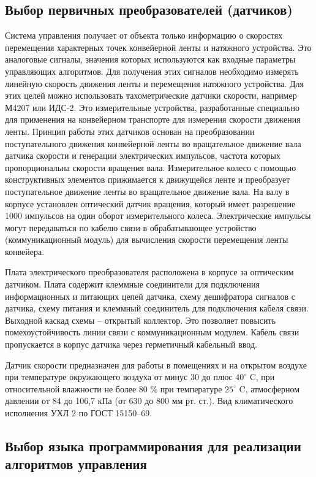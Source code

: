 \subsection{Выбор первичных преобразователей (датчиков)} \label{subsect5_2_4}

Система управления получает от объекта только информацию о скоростях перемещения характерных точек конвейерной ленты и натяжного устройства. Это аналоговые сигналы, значения которых используются как входные параметры управляющих алгоритмов. Для получения этих сигналов необходимо измерять линейную скорость движения ленты и перемещения натяжного устройства. Для этих целей можно использовать тахометрические датчики скорости, например М4207 или ИДС-2. Это измерительные устройства, разработанные специально для применения на конвейерном транспорте для измерения скорости движения ленты. Принцип работы этих датчиков основан на преобразовании поступательного движения конвейерной ленты во вращательное движение вала датчика скорости и генерации электрических импульсов, частота которых пропорциональна скорости вращения вала. Измерительное колесо с помощью конструктивных элементов прижимается к движущейся ленте и преобразует поступательное движение ленты во вращательное движение вала. На валу в корпусе установлен оптический датчик вращения, который имеет разрешение 1000 импульсов на один оборот измерительного колеса. Электрические импульсы могут передаваться по кабелю связи в обрабатывающее устройство (коммуникационный модуль) для вычисления скорости перемещения ленты конвейера.

Плата электрического преобразователя расположена в корпусе за оптическим датчиком. Плата содержит клеммные соединители для подключения информационных и питающих цепей датчика, схему дешифратора сигналов с датчика, схему питания и клеммный соединитель для подключения кабеля связи. Выходной каскад схемы -- открытый коллектор. Это позволяет повысить помехоустойчивость линии связи с коммуникационным модулем. Кабель связи пропускается в корпус датчика через герметичный кабельный ввод.

Датчик скорости предназначен для работы в помещениях и на открытом воздухе при температуре окружающего воздуха от минус 30 до плюс $40^\circ$ C, при относительной влажности не более 80 \% при температуре $25^\circ$ C, атмосферном давлении от 84 до 106,7 кПа (от 630 до 800 мм рт. ст.). Вид климатического исполнения УХЛ 2 по ГОСТ 15150--69.

\subsection{Выбор языка программирования для реализации алгоритмов управления} \label{subsect5_2_5}

